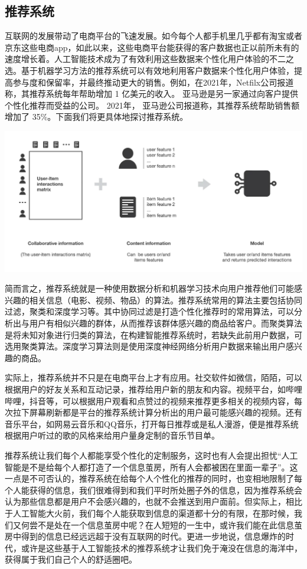 \subsection{推荐系统}
互联网的发展带动了电商平台的飞速发展。如今每个人都手机里几乎都有淘宝或者京东这些电商app，如此以来，这些电商平台能获得的客户数据也正以前所未有的速度增长着。人工智能技术成为了有效利用这些数据来个性化用户体验的不二之选。基于机器学习方法的推荐系统可以有效地利用客户数据来个性化用户体验，提高参与度和保留率，并最终推动更大的销售。例如，在2021年，Netfilx公司报道称，其推荐系统每年帮助增加 1 亿美元的收入。 亚马逊是另一家通过向客户提供个性化推荐而受益的公司。 2021年， 亚马逊公司报道称，其推荐系统帮助销售额增加了 35\%。下面我们将更具体地探讨推荐系统。

\begin{marginfigure}
\includegraphics{images/Internet_05.jpg}
\end{marginfigure}

简而言之，推荐系统就是一种使用数据分析和机器学习技术向用户推荐他们可能感兴趣的相关信息（电影、视频、物品）的算法。推荐系统常用的算法主要包括协同过滤，聚类和深度学习等。其中协同过滤是打造个性化推荐时的常用算法，可以分析出与用户有相似兴趣的群体，从而推荐该群体感兴趣的商品给客户。而聚类算法是将未知对象进行归类的算法，在构建智能推荐系统时，若缺失此前用户数据，可选用聚类算法。深度学习算法则是使用深度神经网络分析用户数据来输出用户感兴趣的商品。

实际上，推荐系统并不只是在电商平台上才有应用。社交软件如微信，陌陌，可以根据用户的好友关系和互动记录，推荐给用户新的朋友和内容。视频平台，如哔哩哔哩，抖音等，可以根据用户观看和点赞过的视频来推荐更多相关的视频内容，每次拉下屏幕刷新都是平台的推荐系统计算分析出的用户最可能感兴趣的视频。还有音乐平台，如网易云音乐和QQ音乐，打开每日推荐或是私人漫游，便是推荐系统根据用户听过的歌的风格来给用户量身定制的音乐节目单。

推荐系统让我们每个人都能享受个性化的定制服务，这时也有人会提出担忧“人工智能是不是给每个人都打造了一个信息茧房，所有人会都被困在里面一辈子”。这一点是不可否认的，推荐系统在给每个人个性化的推荐的同时，也变相地限制了每个人能获得的信息，我们很难得到和我们平时所处圈子外的信息，因为推荐系统会认为那些信息都是用户不会感兴趣的，也就不会推送到用户面前。但实际上，相比于人工智能大火前，我们每个人能获取到信息的渠道都十分的有限，在那时候，我们又何尝不是处在一个信息茧房中呢？在人短短的一生中，或许我们能在此信息茧房中得到的信息已经远远超于没有互联网的时代。更进一步地说，信息爆炸的时代，或许是这些基于人工智能技术的推荐系统才让我们免于淹没在信息的海洋中，获得属于我们自己个人的舒适圈吧。

